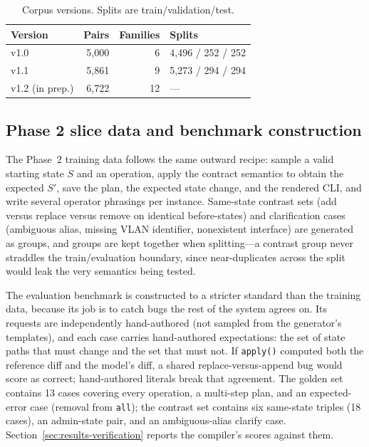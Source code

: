 \documentclass[conference]{IEEEtran}
\begin{document}
\begin{table}[t]
\centering
\caption{Corpus versions. Splits are train/validation/test.}
\label{tab:dataset}
\small
\begin{tabular}{@{}lrrl@{}}
\toprule
\textbf{Version} & \textbf{Pairs} & \textbf{Families} & \textbf{Splits} \\
\midrule
v1.0 & 5,000 & 6 & 4,496 / 252 / 252 \\
v1.1 & 5,861 & 9 & 5,273 / 294 / 294 \\
v1.2 (in prep.) & 6,722 & 12 & --- \\
\bottomrule
\end{tabular}
\end{table}

\subsection{Phase 2 slice data and benchmark construction}

The Phase~2 training data follows the same outward recipe: sample a valid starting state $S$ and an operation, apply the contract semantics to obtain the expected $S'$, save the plan, the expected state change, and the rendered CLI, and write several operator phrasings per instance. Same-state contrast sets (add versus replace versus remove on identical before-states) and clarification cases (ambiguous alias, missing VLAN identifier, nonexistent interface) are generated as groups, and groups are kept together when splitting---a contrast group never straddles the train/evaluation boundary, since near-duplicates across the split would leak the very semantics being tested.

The evaluation benchmark is constructed to a stricter standard than the training data, because its job is to catch bugs the rest of the system agrees on. Its requests are independently hand-authored (not sampled from the generator's templates), and each case carries hand-authored expectations: the set of state paths that must change and the set that must not. If \texttt{apply()} computed both the reference diff and the model's diff, a shared replace-versus-append bug would score as correct; hand-authored literals break that agreement. The golden set contains 13 cases covering every operation, a multi-step plan, and an expected-error case (removal from \texttt{all}); the contrast set contains six same-state triples (18 cases), an admin-state pair, and an ambiguous-alias clarify case. Section~\ref{sec:results-verification} reports the compiler's scores against them.
\end{document}
